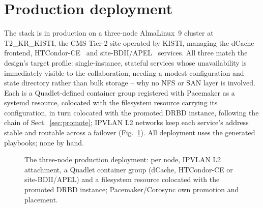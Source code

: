 \documentclass{webofc}
\begin{document}
\section{Production deployment}
\label{sec:deployment}

The stack is in production on a three-node AlmaLinux~9 cluster at
T2\_KR\_KISTI, the CMS Tier-2 site operated by KISTI, managing the
dCache~\cite{dcache} frontend, HTCondor-CE~\cite{htcondorce,condor} and
site-BDII/APEL~\cite{apel} services. All three match the design's target
profile: single-instance, stateful services whose unavailability is
immediately visible to the collaboration, needing a modest configuration
and state directory rather than bulk storage -- why no NFS or SAN layer
is involved. Each is a Quadlet-defined container group registered with
Pacemaker as a systemd resource, colocated with the filesystem resource
carrying its configuration, in turn colocated with the promoted DRBD
instance, following the chain of Sect.~\ref{sec:promote}; IPVLAN L2
networks keep each service's address stable and routable across a
failover (Fig.~\ref{fig:arch}). All deployment uses the generated
playbooks; none by hand.

\begin{figure}[h]
\centering
{}
\caption{The three-node production deployment: per node, IPVLAN L2
attachment, a Quadlet container group (dCache, HTCondor-CE or
site-BDII/APEL) and a filesystem resource colocated with the promoted
DRBD instance; Pacemaker/Corosync own promotion and placement.}
\label{fig:arch}
\end{figure}
\end{document}
